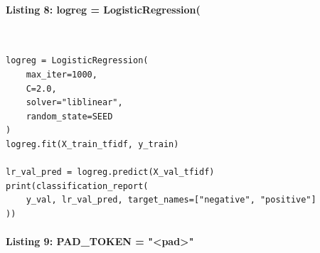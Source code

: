 \documentclass[12pt,a4paper,oneside]{report}
\begin{document}
\paragraph{Listing 8: logreg = LogisticRegression(}\mbox{}\\[-1ex]
\begin{Verbatim}[commandchars=\\\{\},breaklines=true,breakanywhere=true,fontsize=\scriptsize,frame=leftline,framesep=2mm,rulecolor=\color{gray}]
logreg = LogisticRegression(
    max_iter=1000,
    C=2.0,
    solver="liblinear",
    random_state=SEED
)
logreg.fit(X_train_tfidf, y_train)

lr_val_pred = logreg.predict(X_val_tfidf)
print(classification_report(
    y_val, lr_val_pred, target_names=["negative", "positive"]
))
\end{Verbatim}
\paragraph{Listing 9: PAD\_TOKEN = "<pad>"}\mbox{}\\[-1ex]
\end{document}
